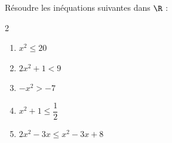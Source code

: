 \begin{exo}{}
	Résoudre les inéquations suivantes dans $\R$ :
	\vspace*{-2mm}
	\begin{multicols}{2}
		\begin{enumerate}[itemsep=2mm]
			\item $x^2 \le 20$
			\item $2x^2 + 1 < 9$
			\item $-x^2 > -7$
			\item $x^2 + 1 \le \dfrac{1}{2}$
			\item $2x^2 - 3x \le x^2 - 3x + 8$
		\end{enumerate}
	\end{multicols}\vspace*{-2mm}
\end{exo}
